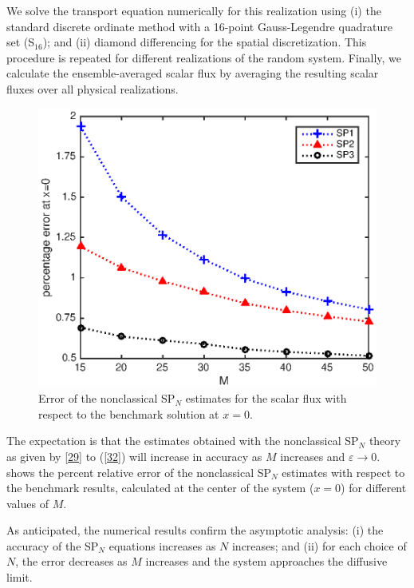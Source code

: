 \documentclass{anstrans}
\newcommand{\ep}{\varepsilon}
\begin{document}
We solve the transport equation numerically for this realization using (i) the standard discrete ordinate method with a 16-point Gauss-Legendre quadrature set (S$_{16}$); and (ii) diamond differencing for the spatial discretization.
This procedure is repeated for different realizations of the random system.
Finally, we calculate the ensemble-averaged scalar flux by averaging the resulting scalar fluxes over all physical realizations.
\begin{figure}[ht] %
  \centering
  \includegraphics[scale=0.75]{fig_spn}
  \caption{Error of the nonclassical SP$_N$ estimates for the scalar flux with respect to the benchmark solution at $x=0$.}
  \label{fig}
\end{figure}

The expectation is that the estimates obtained with the nonclassical SP$_N$ theory as given by \cref{29} to (\ref{32}) will increase in accuracy as $M$ increases and $\ep\rightarrow 0$.
 shows the percent relative error of the nonclassical SP$_N$ estimates with respect to the benchmark results, calculated at the center of the system ($x=0$) for different values of $M$. 

As anticipated, the numerical results confirm the asymptotic analysis: (i) the accuracy of the SP$_N$ equations increases as $N$ increases; and (ii) for each choice of $N$, the error decreases as $M$ increases and the system approaches the diffusive limit.

\end{document}
